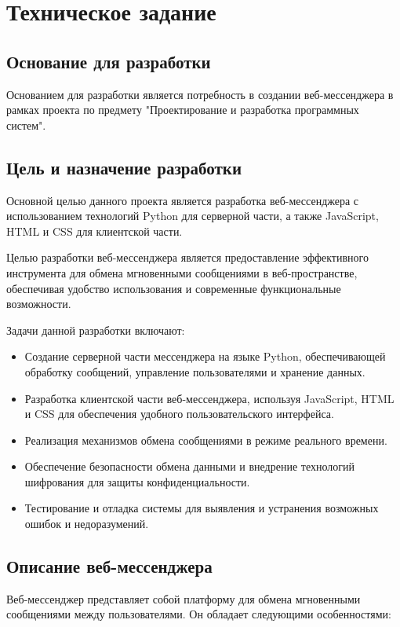 \section{Техническое задание}
\subsection{Основание для разработки}

Основанием для разработки является потребность в создании веб-мессенджера в рамках проекта по предмету "Проектирование и разработка программных систем".

\subsection{Цель и назначение разработки}

Основной целью данного проекта является разработка веб-мессенджера с использованием технологий Python для серверной части, а также JavaScript, HTML и CSS для клиентской части.

Целью разработки веб-мессенджера является предоставление эффективного инструмента для обмена мгновенными сообщениями в веб-пространстве, обеспечивая удобство использования и современные функциональные возможности.

Задачи данной разработки включают:
\begin{itemize}
	\item Создание серверной части мессенджера на языке Python, обеспечивающей обработку сообщений, управление пользователями и хранение данных.
	\item Разработка клиентской части веб-мессенджера, используя JavaScript, HTML и CSS для обеспечения удобного пользовательского интерфейса.
	\item Реализация механизмов обмена сообщениями в режиме реального времени.
	\item Обеспечение безопасности обмена данными и внедрение технологий шифрования для защиты конфиденциальности.
	\item Тестирование и отладка системы для выявления и устранения возможных ошибок и недоразумений.
\end{itemize}

\subsection{Описание веб-мессенджера}

Веб-мессенджер представляет собой платформу для обмена мгновенными сообщениями между пользователями. Он обладает следующими особенностями:

